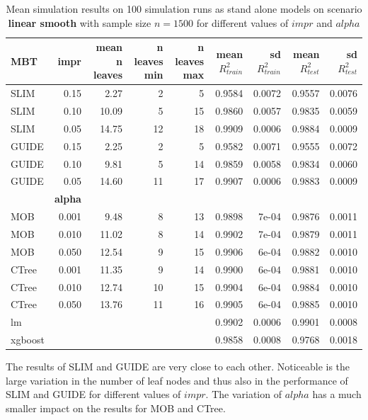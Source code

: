\begin{table}[!htb] 
\centering \tiny
\begin{tabular}[t]{l|r|r|r|r|r|r|r|r}
\hline
MBT & \textbf{impr} & mean n leaves & n leaves min & n leaves max & mean $R^2_{train}$ & sd $R^2_{train}$ & mean $R^2_{test}$ & sd $R^2_{test}$\\
\hline
SLIM & 0.15 & 2.27 & 2 & 5 & 0.9584 & 0.0072 & 0.9557 & 0.0076\\
SLIM & 0.10 & 10.09 & 5 & 15 & 0.9860 & 0.0057 & 0.9835 & 0.0059\\
SLIM & 0.05 & 14.75 & 12 & 18 & 0.9909 & 0.0006 & 0.9884 & 0.0009\\
GUIDE & 0.15 & 2.25 & 2 & 5 & 0.9582 & 0.0071 & 0.9555 & 0.0072\\
GUIDE & 0.10 & 9.81 & 5 & 14 & 0.9859 & 0.0058 & 0.9834 & 0.0060\\
GUIDE & 0.05 & 14.60 & 11 & 17 & 0.9907 & 0.0006 & 0.9883 & 0.0009\\
\hline
 & \textbf{alpha} &  &  &  &  &  &  & \\
\hline
MOB & 0.001 & 9.48 & 8 & 13 & 0.9898 & 7e-04 & 0.9876 & 0.0011\\
MOB & 0.010 & 11.02 & 8 & 14 & 0.9902 & 7e-04 & 0.9879 & 0.0011\\
MOB & 0.050 & 12.54 & 9 & 15 & 0.9906 & 6e-04 & 0.9882 & 0.0010\\
CTree & 0.001 & 11.35 & 9 & 14 & 0.9900 & 6e-04 & 0.9881 & 0.0010\\
CTree & 0.010 & 12.74 & 10 & 15 & 0.9904 & 6e-04 & 0.9884 & 0.0010\\
CTree & 0.050 & 13.76 & 11 & 16 & 0.9905 & 6e-04 & 0.9885 & 0.0010\\
\hline
lm & & & & & 0.9902 & 0.0006 & 0.9901 & 0.0008\\
xgboost & & & & & 0.9858 & 0.0008 & 0.9768 & 0.0018\\
\hline
\end{tabular}
\caption{Mean simulation results on 100 simulation runs as stand alone models on scenario \textbf{linear smooth} with sample size $n = 1500$ for different values of $impr$ and $alpha$}
\label{tab:linear_smooth_summary}
\end{table}


The results of SLIM and GUIDE are very close to each other. Noticeable is the large variation in the number of leaf nodes and thus also in the performance of SLIM and GUIDE for different values of $impr$. The variation of $alpha$ has a much smaller impact on the results for MOB and CTree.

